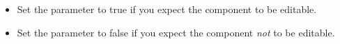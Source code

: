 \begin{itemize}
\item Set the parameter to true if you expect the component to be editable.
\item Set the parameter to false if you expect the component \emph{not} to be editable.
\end{itemize}
